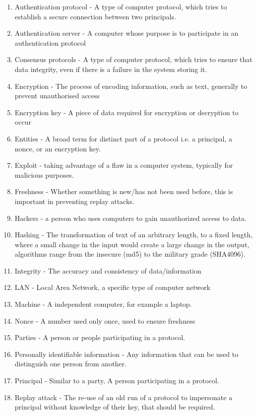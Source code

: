 \documentclass{article}
\begin{document}
\begin{enumerate}
    \item Authentication protocol - A type of computer protocol, which tries to establish a secure connection between two principals.
    \item Authentication server - A computer whose purpose is to participate in an authentication protocol
    \item Consensus protocols - A type of computer protocol, which tries to ensure that data integrity, even if there is a failure in the system storing it.
    \item Encryption - The process of encoding information, such as text, generally to prevent unauthorised access
    \item Encryption key - A piece of data required for encryption or decryption to occur
    \item Entities - A broad term for distinct part of a protocol i.e. a principal, a nonce, or an encryption key.
    \item Exploit - taking advantage of a flaw in a computer system, typically for malicious purposes.
    \item Freshness - Whether something is new/has not been used before, this is important in preventing replay attacks.
    \item Hackers - a person who uses computers to gain unauthorized access to data.
    \item Hashing - The transformation of text of an arbitrary length, to a fixed length, where a small change in the input would create a large change in the output, algorithms range from the insecure (md5) to the military grade (SHA4096).
    \item Integrity - The accuracy and consistency of data/information
    \item LAN - Local Area Network, a specific type of computer network
    \item Machine - A independent computer, for example a laptop.
    \item Nonce - A number used only once, used to ensure freshness
    \item Parties - A person or people participating in a protocol.
    \item Personally identifiable information - Any information that can be used to distinguish one person from another.
    \item Principal - Similar to a party, A person participating in a protocol.
    \item Replay attack - The re-use of an old run of a protocol to impersonate a principal without knowledge of their key, that should be required.

\end{enumerate}
\end{document}
